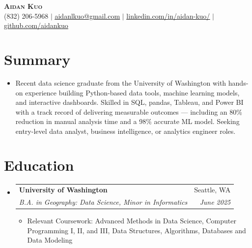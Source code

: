 \documentclass[letterpaper,11pt]{article}
\makeatletter
\newcommand{\resumeItem}[1]{
  \item\small{
    {#1 \vspace{-2pt}}
  }
}
\newcommand{\resumeSubheading}[4]{
  \vspace{-2pt}\item
    \begin{tabular*}{0.97\textwidth}[t]{l@{\extracolsep{\fill}}r}
      \textbf{#1} & #2 \\
      \textit{\small#3} & \textit{\small #4} \\
    \end{tabular*}\vspace{-7pt}
}
\newcommand{\resumeSubHeadingListStart}{\begin{itemize}[leftmargin=0.15in, label={}]}
\newcommand{\resumeSubHeadingListEnd}{\end{itemize}}
\newcommand{\resumeItemListStart}{\begin{itemize}}
\newcommand{\resumeItemListEnd}{\end{itemize}\vspace{-5pt}}
\makeatother
\begin{document}

\begin{center}
    \textbf{\Huge \scshape Aidan Kuo} \\ \vspace{1pt}
    \small (832) 206-5968 $|$ \href{mailto:aidanlkuo@gmail.com}{\underline{aidanlkuo@gmail.com}} $|$ 
    \href{https://linkedin.com/in/aidan-kuo/}{\underline{linkedin.com/in/aidan-kuo/}} $|$
    \href{https://github.com/aidankuo}{\underline{github.com/aidankuo}}
\end{center}

\section{Summary}
\resumeSubHeadingListStart
  \item \small{Recent data science graduate from the University of Washington with hands-on experience building Python-based data tools, machine learning models, and interactive dashboards. Skilled in SQL, pandas, Tableau, and Power BI with a track record of delivering measurable outcomes — including an {80\%} reduction 
  in manual analysis time and a {98\%} accurate ML model. Seeking entry-level data analyst, business intelligence, or analytics engineer roles.}
\resumeSubHeadingListEnd

\section{Education}
  \resumeSubHeadingListStart
    \resumeSubheading
      {University of Washington}{Seattle, WA}
      {B.A. in Geography: Data Science, Minor in Informatics}{June 2025}
    \resumeItemListStart
      \resumeItem{Relevant Coursework: Advanced Methods in Data Science, Computer Programming I, II, and III, Data Structures, Algorithms, Databases and Data Modeling}
    \resumeItemListEnd
  \resumeSubHeadingListEnd
\end{document}
